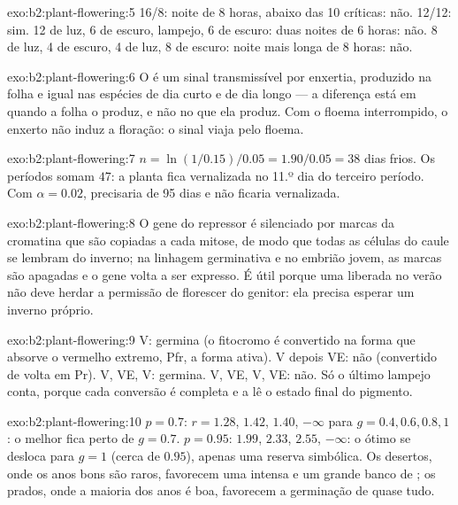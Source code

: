 \begin{solution}{exo:b2:plant-flowering:5}
16/8: noite de 8 horas, abaixo das 10 críticas: não. 12/12: sim.
12 de luz, 6 de escuro, lampejo, 6 de escuro: duas noites de 6 horas:
não. 8 de luz, 4 de escuro, 4 de luz, 8 de escuro: noite mais longa de
8 horas: não.
\end{solution}

\begin{solution}{exo:b2:plant-flowering:6}
O  é um sinal transmissível por enxertia, produzido na folha
e igual nas espécies de dia curto e de dia longo --- a diferença está
em quando a folha o produz, e não no que ela produz. Com o floema
interrompido, o enxerto não induz a floração: o sinal viaja pelo
floema.
\end{solution}

\begin{solution}{exo:b2:plant-flowering:7}
$n = \ln(1/0.15)/0.05 = 1.90/0.05 = 38$ dias frios. Os períodos somam
$47$: a planta fica vernalizada no 11.º dia do terceiro período.
Com $\alpha = 0.02$, precisaria de 95 dias e não ficaria vernalizada.
\end{solution}

\begin{solution}{exo:b2:plant-flowering:8}
O gene do repressor é silenciado por marcas da cromatina que são
copiadas a cada mitose, de modo que todas as células do caule se
lembram do inverno; na linhagem germinativa e no embrião jovem, as
marcas são apagadas e o gene volta a ser expresso. É útil porque uma
 liberada no verão não deve herdar a permissão de florescer do
genitor: ela precisa esperar um inverno próprio.
\end{solution}

\begin{solution}{exo:b2:plant-flowering:9}
V: germina (o fitocromo é convertido na forma que absorve o vermelho
extremo, Pfr, a forma ativa). V depois VE: não (convertido de volta em
Pr). V, VE, V: germina. V, VE, V, VE: não. Só o último lampejo conta,
porque cada conversão é completa e a  lê o estado final do
pigmento.
\end{solution}

\begin{solution}{exo:b2:plant-flowering:10}
$p = 0.7$: $r = 1.28$, $1.42$, $1.40$, $-\infty$ para $g = 0.4, 0.6, 0.8,
1$: o melhor fica perto de $g = 0.7$. $p = 0.95$: $1.99$, $2.33$, $2.55$,
$-\infty$: o ótimo se desloca para $g = 1$ (cerca de $0.95$), apenas uma
reserva simbólica. Os desertos, onde os anos bons são raros, favorecem
uma  intensa e um grande banco de ; os prados, onde a
maioria dos anos é boa, favorecem a germinação de quase tudo.
\end{solution}

